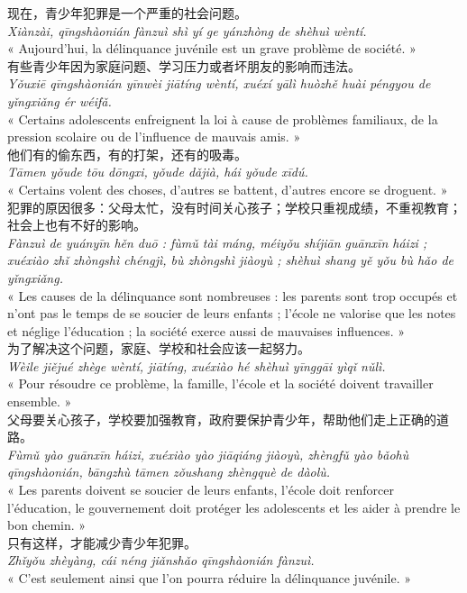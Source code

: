 \documentclass[11pt]{article}
\begin{document}
\begin{textebox}
现在，青少年犯罪是一个严重的社会问题。\\
\emph{Xiànzài, qīngshàonián fànzuì shì yí ge yánzhòng de shèhuì wèntí.}\\
« Aujourd'hui, la délinquance juvénile est un grave problème de société. »\\[4pt]
有些青少年因为家庭问题、学习压力或者坏朋友的影响而违法。\\
\emph{Yǒuxiē qīngshàonián yīnwèi jiātíng wèntí, xuéxí yālì huòzhě huài péngyou de yǐngxiǎng ér wéifǎ.}\\
« Certains adolescents enfreignent la loi à cause de problèmes familiaux, de la pression scolaire ou de l'influence de mauvais amis. »\\[4pt]
他们有的偷东西，有的打架，还有的吸毒。\\
\emph{Tāmen yǒude tōu dōngxi, yǒude dǎjià, hái yǒude xīdú.}\\
« Certains volent des choses, d'autres se battent, d'autres encore se droguent. »\\[4pt]
犯罪的原因很多：父母太忙，没有时间关心孩子；学校只重视成绩，不重视教育；社会上也有不好的影响。\\
\emph{Fànzuì de yuányīn hěn duō : fùmǔ tài máng, méiyǒu shíjiān guānxīn háizi ; xuéxiào zhǐ zhòngshì chéngjì, bù zhòngshì jiàoyù ; shèhuì shang yě yǒu bù hǎo de yǐngxiǎng.}\\
« Les causes de la délinquance sont nombreuses : les parents sont trop occupés et n'ont pas le temps de se soucier de leurs enfants ; l'école ne valorise que les notes et néglige l'éducation ; la société exerce aussi de mauvaises influences. »\\[4pt]
为了解决这个问题，家庭、学校和社会应该一起努力。\\
\emph{Wèile jiějué zhège wèntí, jiātíng, xuéxiào hé shèhuì yīnggāi yìqǐ nǔlì.}\\
« Pour résoudre ce problème, la famille, l'école et la société doivent travailler ensemble. »\\[4pt]
父母要关心孩子，学校要加强教育，政府要保护青少年，帮助他们走上正确的道路。\\
\emph{Fùmǔ yào guānxīn háizi, xuéxiào yào jiāqiáng jiàoyù, zhèngfǔ yào bǎohù qīngshàonián, bāngzhù tāmen zǒushang zhèngquè de dàolù.}\\
« Les parents doivent se soucier de leurs enfants, l'école doit renforcer l'éducation, le gouvernement doit protéger les adolescents et les aider à prendre le bon chemin. »\\[4pt]
只有这样，才能减少青少年犯罪。\\
\emph{Zhǐyǒu zhèyàng, cái néng jiǎnshǎo qīngshàonián fànzuì.}\\
« C'est seulement ainsi que l'on pourra réduire la délinquance juvénile. »
\end{textebox}
\end{document}
